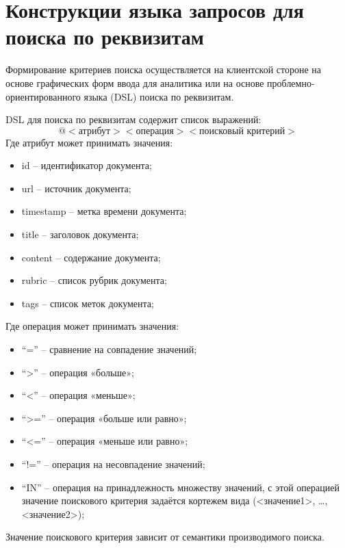 \documentclass[russian,utf8,emptystyle]{eskdtext}
\makeatletter
\newcounter{pageaux}
\def\currentauxref{PAGEAUX1}
\newcommand{\resetpageaux}{%
  \clearpage
  \edef\@currentlabel{\thepageaux}\label{\currentauxref}%
  \xdef\currentauxref{PAGEAUX\thepage}%
  \setcounter{pageaux}{0}}
\makeatother
\begin{document}
\section{Конструкции языка запросов для поиска по реквизитам}

Формирование критериев поиска осуществляется на клиентской стороне на основе графических форм ввода для аналитика или на основе проблемно-ориентированного языка (DSL) поиска по реквизитам.

DSL для поиска по реквизитам содержит список выражений:
\begin{equation}
@ <\text{атрибут}> <\text{операция}> <\text{поисковый критерий}> 
\end{equation}
Где атрибут может принимать значения:
\begin{itemize}
\item id -- идентификатор документа;
\item url -- источник документа;
\item timestamp -- метка времени документа;
\item title -- заголовок документа;
\item content -- содержание документа;
\item rubric -- список рубрик документа;
\item tags -- список меток документа;
\end{itemize}

Где операция может принимать значения:
\begin{itemize}
\item “=” – сравнение на совпадение значений;
\item “>” – операция «больше»;
\item “<” – операция «меньше»;
\item “>=” – операция «больше или равно»;
\item “<=” – операция «меньше или равно»;
\item “!=” – операция на несовпадение значений;
\item “IN” – операция на принадлежность множеству значений, с этой операцией значение поискового критерия задаётся кортежем вида (<значение1>, …, <значение2>);
\end{itemize}

Значение поискового критерия зависит от семантики производимого поиска.


\resetpageaux
\end{document}

